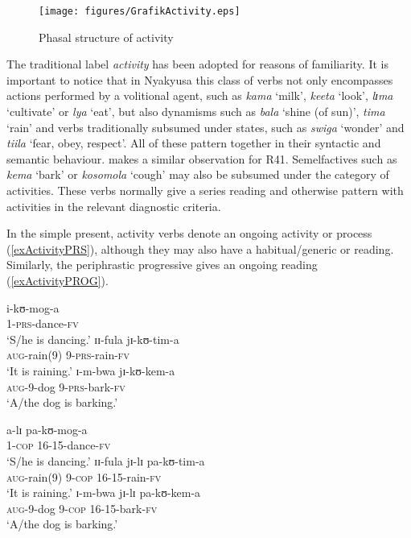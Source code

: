 \begin{figure}[h]
\begin{center}
\texttt{[image: figures/GrafikActivity.eps]}
\end{center}
\caption{Phasal structure of activity}
\label{FigureActivity}
\end{figure}
The traditional label \textit{activity} has been adopted for reasons of familiarity. It is important to notice that in Nyakyusa this class of verbs not only encompasses actions performed by a volitional agent, such as \textit{kama} `milk', \textit{keeta} `look', \textit{lɪma} `cultivate' or \textit{lya} `eat', but also dynamisms such as \textit{bala} `shine (of sun)', \textit{tima} `rain' and verbs traditionally subsumed under states, such as \textit{swiga} `wonder' and \textit{tiila} `fear, obey, respect'. All of these pattern together in their syntactic and semantic behaviour. \citet[271f]{SeidelF2008} makes a similar observation for  R41.  Semelfactives such as \textit{kema} \lq bark' or \textit{kosomola} \lq cough' may also be subsumed under the category of activities. These verbs normally give a series reading and otherwise pattern with activities in the relevant diagnostic criteria.
 
In the simple present, activity verbs denote an ongoing activity or process (\ref{exActivityPRS}), although they may also have a habitual/generic or  reading. Similarly, the periphrastic progressive gives an ongoing reading (\ref{exActivityPROG}).

\begin{exe}
\ex \label{exActivityPRS}
\begin{xlist}
\ex \gll i-kʊ-mog-a\\
 1-\textsc{prs}-dance-\textsc{fv}\\
\glt `S/he is dancing.'
\ex \gll ɪɪ-fula jɪ-kʊ-tim-a\\
\textsc{aug}-rain(9) 9-\textsc{prs}-rain-\textsc{fv}\\
\glt `It is raining.'
\ex \gll ɪ-m-bwa jɪ-kʊ-kem-a\\
\textsc{aug}-9-dog 9-\textsc{prs}-bark-\textsc{fv}\\
\glt `A/the dog is barking.'
\end{xlist}

\ex \label{exActivityPROG}
\begin{xlist}
\ex \gll a-lɪ pa-kʊ-mog-a\\
1-\textsc{cop} 16-15-dance-\textsc{fv}\\
\glt `S/he is dancing.'
\ex \gll ɪɪ-fula jɪ-lɪ pa-kʊ-tim-a\\
\textsc{aug}-rain(9) 9-\textsc{cop} 16-15-rain-\textsc{fv}\\
\glt \lq It is raining.'
\ex \gll ɪ-m-bwa jɪ-lɪ pa-kʊ-kem-a\\
\textsc{aug}-9-dog 9-\textsc{cop} 16-15-bark-\textsc{fv}\\
\glt `A/the dog is barking.'
\end{xlist}
\end{exe}

